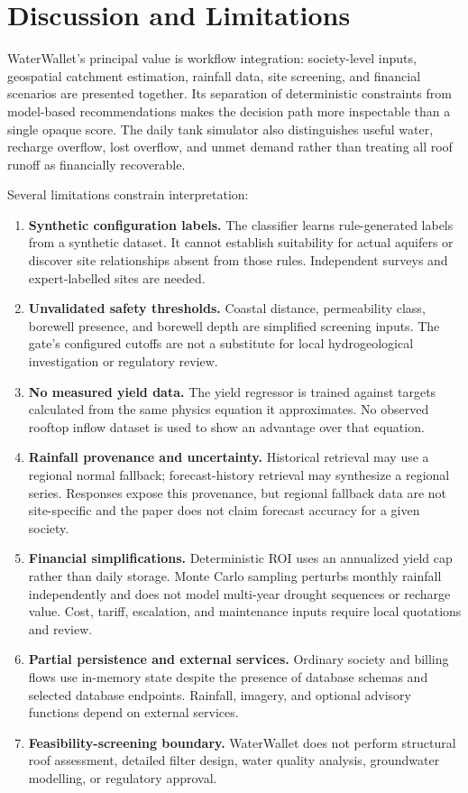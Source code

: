 \documentclass[conference]{IEEEtran}
\begin{document}
\section{Discussion and Limitations}
\label{sec:discussion}

WaterWallet's principal value is workflow integration: society-level
inputs, geospatial catchment estimation, rainfall data, site screening,
and financial scenarios are presented together. Its separation of
deterministic constraints from model-based recommendations makes the
decision path more inspectable than a single opaque score. The daily tank
simulator also distinguishes useful water, recharge overflow, lost
overflow, and unmet demand rather than treating all roof runoff as
financially recoverable.

Several limitations constrain interpretation:
\begin{enumerate}
  \item \textbf{Synthetic configuration labels.} The classifier learns
    rule-generated labels from a synthetic dataset. It cannot establish
    suitability for actual aquifers or discover site relationships
    absent from those rules. Independent surveys and expert-labelled
    sites are needed.
  \item \textbf{Unvalidated safety thresholds.} Coastal distance,
    permeability class, borewell presence, and borewell depth are
    simplified screening inputs. The gate's configured cutoffs are not a
    substitute for local hydrogeological investigation or regulatory
    review.
  \item \textbf{No measured yield data.} The yield regressor is trained
    against targets calculated from the same physics equation it
    approximates. No observed rooftop inflow dataset is used to show an
    advantage over that equation.
  \item \textbf{Rainfall provenance and uncertainty.} Historical
    retrieval may use a regional normal fallback; forecast-history
    retrieval may synthesize a regional series. Responses expose this
    provenance, but regional fallback data are not site-specific and
    the paper does not claim forecast accuracy for a given society.
  \item \textbf{Financial simplifications.} Deterministic ROI uses an
    annualized yield cap rather than daily storage. Monte Carlo sampling
    perturbs monthly rainfall independently and does not model
    multi-year drought sequences or recharge value. Cost, tariff,
    escalation, and maintenance inputs require local quotations and
    review.
  \item \textbf{Partial persistence and external services.} Ordinary
    society and billing flows use in-memory state despite the presence
    of database schemas and selected database endpoints. Rainfall,
    imagery, and optional advisory functions depend on external
    services.
  \item \textbf{Feasibility-screening boundary.} WaterWallet does not
    perform structural roof assessment, detailed filter design, water
    quality analysis, groundwater modelling, or regulatory approval.
\end{enumerate}
\end{document}
